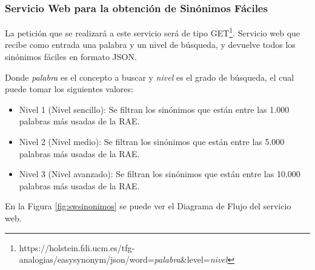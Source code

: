  


\subsubsection{Servicio Web para la obtención de Sinónimos Fáciles}
\label{cap:subsec:sw_sinonimosfaciles}

La petición que se realizará a este servicio será de tipo GET\footnote{https://holstein.fdi.ucm.es/tfg-analogias/easysynonym/json/word=\textit{palabra}\&level=\textit{nivel}}.
Servicio web que recibe como entrada una palabra y un nivel de búsqueda, y devuelve todos los sinónimos fáciles en formato JSON. 

Donde \textit{palabra} es el concepto a buscar y \textit{nivel} es el grado de búsqueda, el cual puede tomar los siguientes valores:
\begin{itemize}
	\item Nivel 1 (Nivel sencillo): Se filtran los sinónimos que están entre las 1.000 palabras más usadas de la RAE.
	\item Nivel 2 (Nivel medio): Se filtran los sinónimos que están entre las 5.000 palabras más usadas de la RAE.
	\item Nivel 3 (Nivel avanzado): Se filtran los sinónimos que están entre las 10.000 palabras más usadas de la RAE.
\end{itemize}
En la Figura \ref{fig:swsinonimos} se puede ver el Diagrama de Flujo del servicio web.

